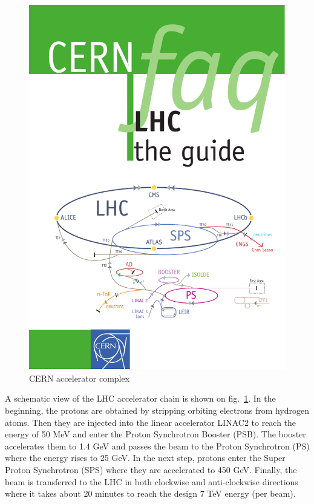 \begin{figure}[!htbp]
  \begin{center}
    \leavevmode
    \includegraphics[width=\columnwidth]{LHC}
    \caption{CERN accelerator complex}
    \label{LHC}
  \end{center}
\end{figure}

A schematic view of the LHC accelerator chain is shown on fig.~\ref{LHC}. In the beginning, the protons are obtained by
stripping orbiting electrons from hydrogen atoms. Then they are injected into the linear accelerator LINAC2 to reach the
energy of 50 MeV and enter the Proton Synchrotron Booster (PSB). The booster accelerates them to 1.4 GeV and passes the
beam to the Proton Synchrotron (PS) where the energy rises to 25 GeV. In the next step, protons enter the Super Proton
Synchrotron (SPS) where they are accelerated to 450 GeV. Finally, the beam is transferred to the LHC in both clockwise
and anti-clockwise directions where it takes about 20 minutes to reach the design 7 TeV energy (per beam).

